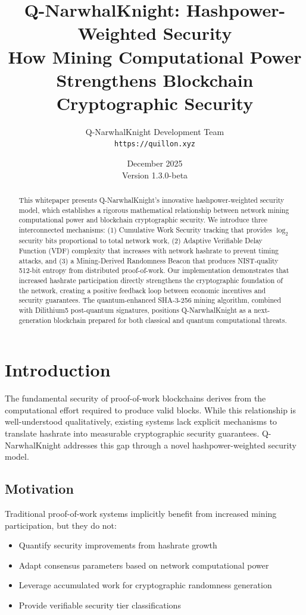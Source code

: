 \documentclass[11pt,a4paper]{article}
\title{
    \vspace{-1cm}
    \textbf{Q-NarwhalKnight: Hashpower-Weighted Security} \\
    \large How Mining Computational Power Strengthens Blockchain Cryptographic Security
}
\author{
    Q-NarwhalKnight Development Team \\
    \texttt{https://quillon.xyz}
}
\date{December 2025 \\ Version 1.3.0-beta}
\begin{document}
\maketitle

\begin{abstract}
This whitepaper presents Q-NarwhalKnight's innovative hashpower-weighted security model, which establishes a rigorous mathematical relationship between network mining computational power and blockchain cryptographic security. We introduce three interconnected mechanisms: (1) Cumulative Work Security tracking that provides $\log_2$ security bits proportional to total network work, (2) Adaptive Verifiable Delay Function (VDF) complexity that increases with network hashrate to prevent timing attacks, and (3) a Mining-Derived Randomness Beacon that produces NIST-quality 512-bit entropy from distributed proof-of-work. Our implementation demonstrates that increased hashrate participation directly strengthens the cryptographic foundation of the network, creating a positive feedback loop between economic incentives and security guarantees. The quantum-enhanced SHA-3-256 mining algorithm, combined with Dilithium5 post-quantum signatures, positions Q-NarwhalKnight as a next-generation blockchain prepared for both classical and quantum computational threats.
\end{abstract}

\tableofcontents
\newpage

\section{Introduction}

The fundamental security of proof-of-work blockchains derives from the computational effort required to produce valid blocks. While this relationship is well-understood qualitatively, existing systems lack explicit mechanisms to translate hashrate into measurable cryptographic security guarantees. Q-NarwhalKnight addresses this gap through a novel hashpower-weighted security model.

\subsection{Motivation}

Traditional proof-of-work systems implicitly benefit from increased mining participation, but they do not:
\begin{itemize}
    \item Quantify security improvements from hashrate growth
    \item Adapt consensus parameters based on network computational power
    \item Leverage accumulated work for cryptographic randomness generation
    \item Provide verifiable security tier classifications
\end{itemize}
\end{document}

